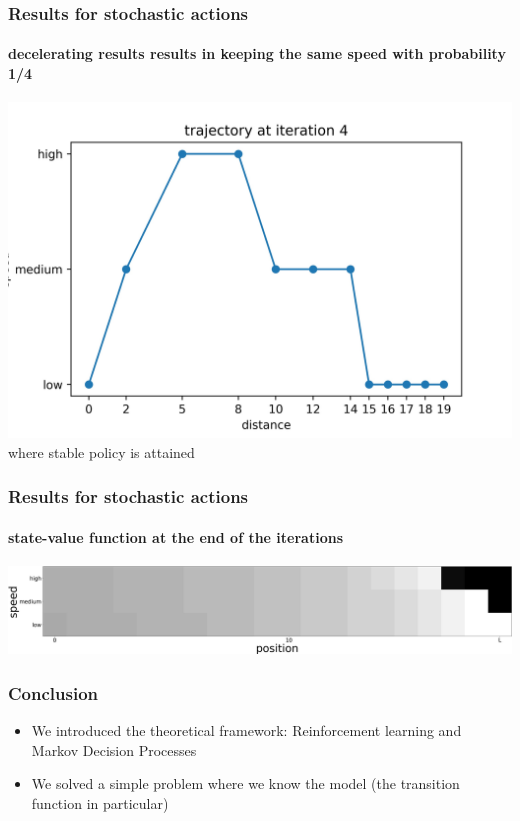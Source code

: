 \documentclass[dvipsnames,svgnames]{beamer}
\begin{document}
\begin{frame}
\frametitle{Results for stochastic actions}
\framesubtitle{decelerating results results in keeping the same speed with probability 1/4}
\centering
\includegraphics[scale=0.5]{img/trajectory4.jpg}\\
\centering
where stable policy is attained 
\end{frame}


\begin{frame}
\frametitle{Results for stochastic actions}
\framesubtitle{state-value function at the end of the iterations
}
\centering
\includegraphics[scale=0.7]{img/state_values_sto.jpg}
\end{frame}


\begin{frame}
\frametitle{Conclusion }
\begin{block}{}
\begin{itemize}
\item We introduced the theoretical framework: Reinforcement learning and Markov Decision Processes
\item We solved a simple problem where we know the model (the transition function in particular)
\end{itemize}
\end{block}
\end{frame}
\end{document}
